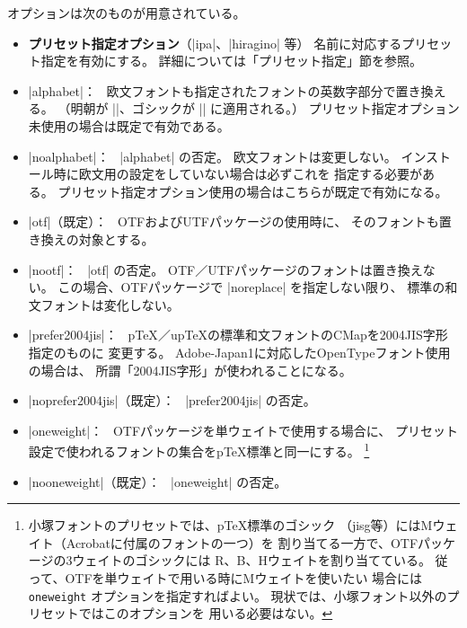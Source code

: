 \documentclass[a4paper,uplatex]{jsarticle}
\newcommand{\Pkg}[1]{\textsf{#1}}
\newcommand{\Means}{：\ }
\providecommand{\pTeX}{p\TeX}
\providecommand{\upTeX}{u\pTeX}
\begin{document}
オプションは次のものが用意されている。

\begin{itemize}
\item \textbf{プリセット指定オプション}（|ipa|、|hiragino| 等）
  名前に対応するプリセット指定を有効にする。
  詳細については「プリセット指定」節を参照。
\item |alphabet|\Means
  欧文フォントも指定されたフォントの英数字部分で置き換える。
  （明朝が |\rmfamily|、ゴシックが |\sffamily| に適用される。）
  プリセット指定オプション未使用の場合は既定で有効である。
\item |noalphabet|\Means
  |alphabet| の否定。
  欧文フォントは変更しない。
  インストール時に欧文用の設定をしていない場合は必ずこれを
  指定する必要がある。
  プリセット指定オプション使用の場合はこちらが既定で有効になる。
\item |otf|（既定）\Means
  \Pkg{OTF}および\Pkg{UTF}パッケージの使用時に、
  そのフォントも置き換えの対象とする。
\item |nootf|\Means
  |otf| の否定。
  \Pkg{OTF}／\Pkg{UTF}パッケージのフォントは置き換えない。
  この場合、\Pkg{OTF}パッケージで |noreplace| を指定しない限り、
  標準の和文フォントは変化しない。
\item |prefer2004jis|\Means
  {\pTeX}／{\upTeX}の標準和文フォントのCMapを2004JIS字形指定のものに
  変更する。
  Adobe-Japan1に対応したOpenTypeフォント使用の場合は、
  所謂「2004JIS字形」が使われることになる。
\item |noprefer2004jis|（既定）\Means
  |prefer2004jis| の否定。
\item |oneweight|\Means
  \Pkg{OTF}パッケージを単ウェイトで使用する場合に、
  プリセット設定で使われるフォントの集合を{\pTeX}標準と同一にする。
  \<\footnote{小塚フォントのプリセットでは、{\pTeX}標準のゴシック
  （jisg等）にはMウェイト（Acrobatに付属のフォントの一つ）を
  割り当てる一方で、\Pkg{OTF}パッケージの3ウェイトのゴシックには
  R、B、Hウェイトを割り当てている。
  従って、\Pkg{OTF}を単ウェイトで用いる時にMウェイトを使いたい
  場合には \texttt{oneweight} オプションを指定すればよい。
  現状では、小塚フォント以外のプリセットではこのオプションを
  用いる必要はない。}
\item |nooneweight|（既定）\Means
  |oneweight| の否定。
\end{itemize}
\end{document}

